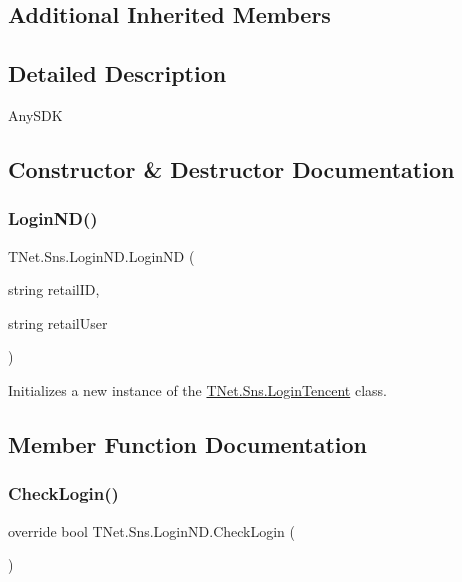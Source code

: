 \subsection*{Additional Inherited Members}


\subsection{Detailed Description}
Any\+S\+DK 



\subsection{Constructor \& Destructor Documentation}
\mbox{\label{class_t_net_1_1_sns_1_1_login_n_d_ae64fb6b6a873ec89b03d2e0e98bf1527}} 
\subsubsection{\texorpdfstring{Login\+N\+D()}{LoginND()}}
{\footnotesize\ttfamily T\+Net.\+Sns.\+Login\+N\+D.\+Login\+ND (\begin{DoxyParamCaption}\item[{string}]{retail\+ID,  }\item[{string}]{retail\+User }\end{DoxyParamCaption})}



Initializes a new instance of the \mbox{\hyperlink{class_t_net_1_1_sns_1_1_login_tencent}{T\+Net.\+Sns.\+Login\+Tencent}} class. 



\subsection{Member Function Documentation}
\mbox{\label{class_t_net_1_1_sns_1_1_login_n_d_a2a3876bdd12ed6e5cc2bd6a653c2d2d0}} 
\subsubsection{\texorpdfstring{Check\+Login()}{CheckLogin()}}
{\footnotesize\ttfamily override bool T\+Net.\+Sns.\+Login\+N\+D.\+Check\+Login (\begin{DoxyParamCaption}{ }\end{DoxyParamCaption})\hspace{0.3cm}{\ttfamily [virtual]}}





